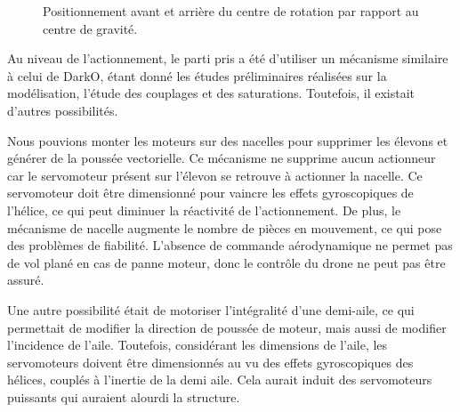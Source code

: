 \begin{figure}[ht!]
    \centering
    \caption{Positionnement avant et arrière du centre de rotation par rapport au centre de gravité.}
    \label{fig:MontageDarkoReglableAvArr}
\end{figure}

Au niveau de l'actionnement, le parti pris a été d'utiliser un mécanisme similaire à celui de DarkO, étant donné les études préliminaires réalisées sur la modélisation, l'étude des couplages et des saturations. Toutefois, il existait d'autres possibilités.

Nous pouvions monter les moteurs sur des nacelles pour supprimer les élevons et générer de la poussée vectorielle. Ce mécanisme ne supprime aucun actionneur car le servomoteur présent sur l'élevon se retrouve à actionner la nacelle. Ce servomoteur doit être dimensionné pour vaincre les effets gyroscopiques de l'hélice, ce qui peut diminuer la réactivité de l'actionnement. De plus, le mécanisme de nacelle augmente le nombre de pièces en mouvement, ce qui pose des problèmes de fiabilité. L'absence de commande aérodynamique ne permet pas de vol plané en cas de panne moteur, donc le contrôle du drone ne peut pas être assuré.

Une autre possibilité était de motoriser l'intégralité d'une demi-aile, ce qui permettait de modifier la direction de poussée de moteur, mais aussi de modifier l'incidence de l'aile. Toutefois, considérant les dimensions de l'aile, les servomoteurs doivent être dimensionnés au vu des effets gyroscopiques des hélices, couplés à l'inertie de la demi aile. Cela aurait induit des servomoteurs puissants qui auraient alourdi la structure.

